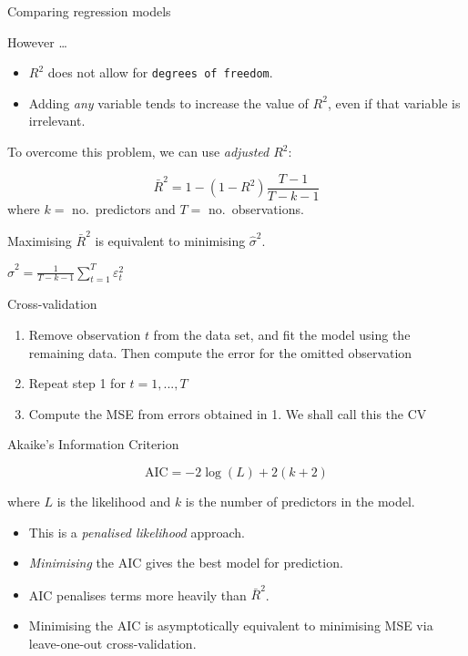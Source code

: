 \documentclass[
  14pt,
  ignorenonframetext,
  aspectratio=169,
]{beamer}
\providecommand{\tightlist}{%
  \setlength{\itemsep}{0pt}\setlength{\parskip}{0pt}}
\begin{document}
\begin{frame}[fragile]{Comparing regression models}
\protect{}\label{comparing-regression-models-1}
\fontsize{11}{13}\sf

However \dots

\begin{itemize}
\item
  \(R^2\) does not allow for \texttt{degrees\ of\ freedom}.
\item
  Adding \emph{any} variable tends to increase the value of \(R^2\),
  even if that variable is irrelevant. \pause
\end{itemize}

To overcome this problem, we can use \emph{adjusted \(R^2\)}:

\begin{block}{}
$$
\bar{R}^2 = 1-(1-R^2)\frac{T-1}{T-k-1}
$$
where $k=$ no.\ predictors and $T=$ no.\ observations.
\end{block}

\pause

\begin{alertblock}{Maximising $\bar{R}^2$ is equivalent to minimising $\hat\sigma^2$.}
\centerline{$\displaystyle
\hat{\sigma}^2 = \frac{1}{T-k-1}\sum_{t=1}^T \varepsilon_t^2$
}
\end{alertblock}
\end{frame}

\begin{frame}{Cross-validation}
\protect{}\label{cross-validation}
\begin{enumerate}
\item
  Remove observation \(t\) from the data set, and fit the model using
  the remaining data. Then compute the error for the omitted observation
\item
  Repeat step 1 for \(t=1,...,T\)
\item
  Compute the MSE from errors obtained in 1. We shall call this the CV
\end{enumerate}
\end{frame}

\begin{frame}{Akaike's Information Criterion}
\protect{}\label{akaikes-information-criterion}
\begin{block}{}
$$
\text{AIC} = -2\log(L) + 2(k+2)
$$
\end{block}

where \(L\) is the likelihood and \(k\) is the number of predictors in
the model.

\begin{itemize}
\tightlist
\item
  This is a \emph{penalised likelihood} approach.
\item
  \emph{Minimising} the AIC gives the best model for prediction.
\item
  AIC penalises terms more heavily than \(\bar{R}^2\).
\item
  Minimising the AIC is asymptotically equivalent to minimising MSE via
  leave-one-out cross-validation.
\end{itemize}
\end{frame}
\end{document}
